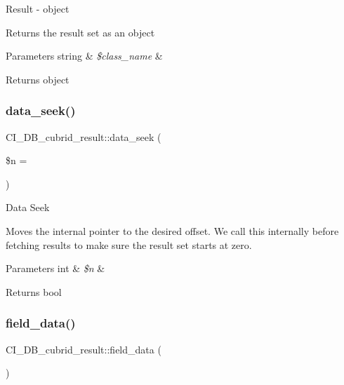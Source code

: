 Result -\/ object

Returns the result set as an object


\begin{DoxyParams}[1]{Parameters}
string & {\em \$class\+\_\+name} & \\
\hline
\end{DoxyParams}
\begin{DoxyReturn}{Returns}
object 
\end{DoxyReturn}
\mbox{\label{class_c_i___d_b__cubrid__result_a31f6ba3ccb3de8e6c3a8c07a40805aaa}} 
\subsubsection{\texorpdfstring{data\+\_\+seek()}{data\_seek()}}
{\footnotesize\ttfamily C\+I\+\_\+\+D\+B\+\_\+cubrid\+\_\+result\+::data\+\_\+seek (\begin{DoxyParamCaption}\item[{}]{\$n = {} }\end{DoxyParamCaption})}

Data Seek

Moves the internal pointer to the desired offset. We call this internally before fetching results to make sure the result set starts at zero.


\begin{DoxyParams}[1]{Parameters}
int & {\em \$n} & \\
\hline
\end{DoxyParams}
\begin{DoxyReturn}{Returns}
bool 
\end{DoxyReturn}
\mbox{\label{class_c_i___d_b__cubrid__result_a7c4b45c7dcad51ac34ac6ffdff916516}} 
\subsubsection{\texorpdfstring{field\+\_\+data()}{field\_data()}}
{\footnotesize\ttfamily C\+I\+\_\+\+D\+B\+\_\+cubrid\+\_\+result\+::field\+\_\+data (\begin{DoxyParamCaption}{ }\end{DoxyParamCaption})}

